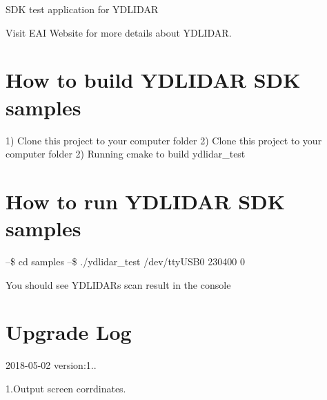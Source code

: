 S\+DK test application for Y\+D\+L\+I\+D\+AR

Visit E\+AI Website for more details about Y\+D\+L\+I\+D\+AR.

\section*{How to build Y\+D\+L\+I\+D\+AR S\+DK samples }

1) Clone this project to your computer folder 2) Clone this project to your computer folder 2) Running cmake to build ydlidar\+\_\+test

\section*{How to run Y\+D\+L\+I\+D\+AR S\+DK samples }

--\$ cd samples --\$ ./ydlidar\+\_\+test /dev/tty\+U\+S\+B0 230400 0

You should see Y\+D\+L\+I\+D\+AR\textquotesingle{}s scan result in the console

\section*{Upgrade Log }

2018-\/05-\/02 version\+:1..

1.\+Output screen corrdinates. 
